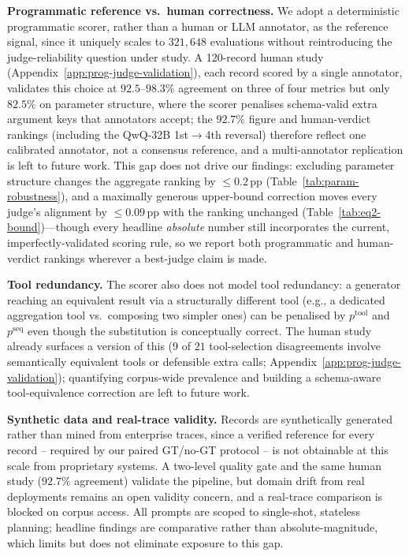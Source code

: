 \textbf{Programmatic reference vs.\ human correctness.} We adopt a deterministic programmatic scorer, rather than a human or LLM annotator, as the reference signal, since it uniquely scales to $321{,}648$ evaluations without reintroducing the judge-reliability question under study. A 120-record human study (Appendix~\ref{app:prog-judge-validation}), each record scored by a single annotator, validates this choice at $92.5$--$98.3\%$ agreement on three of four metrics but only $82.5\%$ on parameter structure, where the scorer penalises schema-valid extra argument keys that annotators accept; the $92.7\%$ figure and human-verdict rankings (including the QwQ-32B 1st$\to$4th reversal) therefore reflect one calibrated annotator, not a consensus reference, and a multi-annotator replication is left to future work. This gap does not drive our findings: excluding parameter structure changes the aggregate ranking by $\leq0.2$\,pp (Table~\ref{tab:param-robustness}), and a maximally generous upper-bound correction moves every judge's alignment by $\leq0.09$\,pp with the ranking unchanged (Table~\ref{tab:eq2-bound})---though every headline \emph{absolute} number still incorporates the current, imperfectly-validated scoring rule, so we report both programmatic and human-verdict rankings wherever a best-judge claim is made.

\textbf{Tool redundancy.} The scorer also does not model tool redundancy: a generator reaching an equivalent result via a structurally different tool (e.g., a dedicated aggregation tool vs.\ composing two simpler ones) can be penalised by $p^{\text{tool}}$ and $p^{\text{seq}}$ even though the substitution is conceptually correct. The human study already surfaces a version of this ($9$ of $21$ tool-selection disagreements involve semantically equivalent tools or defensible extra calls; Appendix~\ref{app:prog-judge-validation}); quantifying corpus-wide prevalence and building a schema-aware tool-equivalence correction are left to future work.

\textbf{Synthetic data and real-trace validity.} Records are synthetically generated rather than mined from enterprise traces, since a verified reference for every record -- required by our paired GT/no-GT protocol -- is not obtainable at this scale from proprietary systems. A two-level quality gate and the same human study ($92.7\%$ agreement) validate the pipeline, but domain drift from real deployments remains an open validity concern, and a real-trace comparison is blocked on corpus access. All prompts are scoped to single-shot, stateless planning; headline findings are comparative rather than absolute-magnitude, which limits but does not eliminate exposure to this gap.

